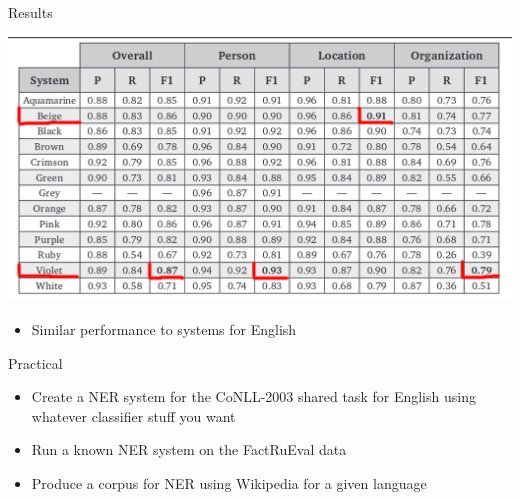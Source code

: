\documentclass[10pt, compress]{beamer}
\begin{document}
\begin{frame}{Results}

\begin{center}
\includegraphics[width=\textwidth]{graphics/factrueval-results.png}
\end{center}

\begin{itemize}
  \item Similar performance to systems for English
\end{itemize}


\end{frame}

\begin{frame}[standout]
Practical
\end{frame}

\begin{frame}

\begin{itemize}
 \item Create a NER system for the CoNLL-2003 shared task for English using
   whatever classifier stuff you want
 \item Run a known NER system on the FactRuEval data
 \item Produce a corpus for NER using Wikipedia for a given language
\end{itemize}

\end{frame}
\end{document}
